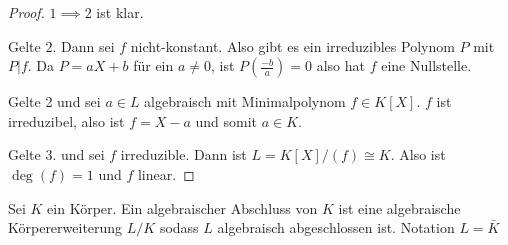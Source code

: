 \begin{proof}

\(1\implies 2\) ist klar.

Gelte \(2\). Dann sei \(f\) nicht-konstant. Also gibt es ein irreduzibles Polynom \(P\) mit \(P|f\). Da \(P=aX+b\) für ein \(a\neq 0\), ist \(P(\frac{-b}{a})=0\) also hat \(f\) eine Nullstelle.

Gelte 2 und sei \(a\in L\) algebraisch mit Minimalpolynom \(f\in K[X]\). \(f\) ist irreduzibel, also ist \(f=X-a\) und somit \(a\in K\).

Gelte 3. und sei \(f\) irreduzible. Dann ist \(L=K[X]/(f)\cong K\). Also ist \(\deg(f)=1\) und \(f\) linear.

\end{proof}

\begin{Def}
    Sei \(K\) ein Körper. Ein algebraischer Abschluss von \(K\) ist eine algebraische Körpererweiterung \(L/K\) sodass \(L\) algebraisch abgeschlossen ist. Notation \(L=\bar K\)
\end{Def}

